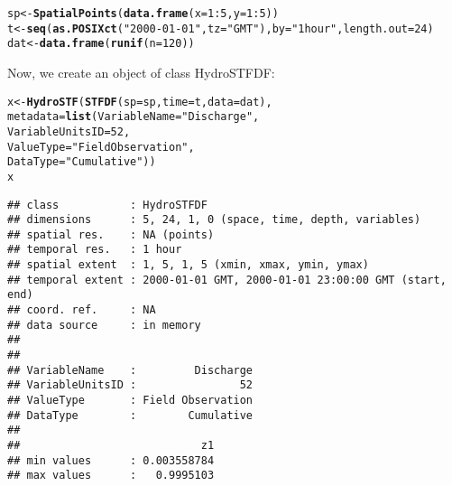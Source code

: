 \documentclass{icldt}\usepackage[]{graphicx}\usepackage[]{color}
\makeatletter
\newcommand{\hlnum}[1]{\textcolor[rgb]{0.686,0.059,0.569}{#1}}%
\newcommand{\hlstr}[1]{\textcolor[rgb]{0.192,0.494,0.8}{#1}}%
\newcommand{\hlopt}[1]{\textcolor[rgb]{0,0,0}{#1}}%
\newcommand{\hlstd}[1]{\textcolor[rgb]{0.345,0.345,0.345}{#1}}%
\newcommand{\hlkwb}[1]{\textcolor[rgb]{0.69,0.353,0.396}{#1}}%
\newcommand{\hlkwc}[1]{\textcolor[rgb]{0.333,0.667,0.333}{#1}}%
\newcommand{\hlkwd}[1]{\textcolor[rgb]{0.737,0.353,0.396}{\textbf{#1}}}%
\newenvironment{kframe}{%
 \def\at@end@of@kframe{}%
 \ifinner\ifhmode%
  \def\at@end@of@kframe{\end{minipage}}%
  \begin{minipage}{\columnwidth}%
 \fi\fi%
 \def\FrameCommand##1{\hskip\@totalleftmargin \hskip-\fboxsep
 \colorbox{shadecolor}{##1}\hskip-\fboxsep
     \hskip-\linewidth \hskip-\@totalleftmargin \hskip\columnwidth}%
 \MakeFramed {\advance\hsize-\width
   \@totalleftmargin\z@ \linewidth\hsize
   \@setminipage}}%
 {\par\unskip\endMakeFramed%
 \at@end@of@kframe}
\newenvironment{knitrout}{}{} %
\makeatother
\begin{document}
\begin{knitrout}
\color{fgcolor}\begin{kframe}
\begin{alltt}
\hlstd{sp} \hlkwb{<-} \hlkwd{SpatialPoints}\hlstd{(}\hlkwd{data.frame}\hlstd{(}\hlkwc{x}\hlstd{=}\hlnum{1}\hlopt{:}\hlnum{5}\hlstd{,} \hlkwc{y}\hlstd{=}\hlnum{1}\hlopt{:}\hlnum{5}\hlstd{))}
\hlstd{t} \hlkwb{<-} \hlkwd{seq}\hlstd{(}\hlkwd{as.POSIXct}\hlstd{(}\hlstr{"2000-01-01"}\hlstd{,} \hlkwc{tz}\hlstd{=}\hlstr{"GMT"}\hlstd{),} \hlkwc{by}\hlstd{=}\hlstr{"1 hour"}\hlstd{,} \hlkwc{length.out}\hlstd{=}\hlnum{24}\hlstd{)}
\hlstd{dat} \hlkwb{<-} \hlkwd{data.frame}\hlstd{(}\hlkwd{runif}\hlstd{(}\hlkwc{n}\hlstd{=}\hlnum{120}\hlstd{))}
\end{alltt}
\end{kframe}
\end{knitrout}

\noindent Now, we create an object of class HydroSTFDF:

\begin{knitrout}
\color{fgcolor}\begin{kframe}
\begin{alltt}
\hlstd{x} \hlkwb{<-} \hlkwd{HydroSTF}\hlstd{(}\hlkwd{STFDF}\hlstd{(}\hlkwc{sp}\hlstd{=sp,} \hlkwc{time}\hlstd{=t,} \hlkwc{data}\hlstd{=dat),}
              \hlkwc{metadata}\hlstd{=}\hlkwd{list}\hlstd{(}\hlkwc{VariableName}\hlstd{=}\hlstr{"Discharge"}\hlstd{,}
                            \hlkwc{VariableUnitsID}\hlstd{=}\hlnum{52}\hlstd{,}
                            \hlkwc{ValueType}\hlstd{=}\hlstr{"Field Observation"}\hlstd{,}
                            \hlkwc{DataType}\hlstd{=}\hlstr{"Cumulative"}\hlstd{))}
\hlstd{x}
\end{alltt}
\begin{verbatim}
## class           : HydroSTFDF
## dimensions      : 5, 24, 1, 0 (space, time, depth, variables)
## spatial res.    : NA (points)
## temporal res.   : 1 hour
## spatial extent  : 1, 5, 1, 5 (xmin, xmax, ymin, ymax)
## temporal extent : 2000-01-01 GMT, 2000-01-01 23:00:00 GMT (start, end)
## coord. ref.     : NA
## data source     : in memory
## 
## 
## VariableName    :         Discharge
## VariableUnitsID :                52
## ValueType       : Field Observation
## DataType        :        Cumulative
## 
##                            z1
## min values      : 0.003558784
## max values      :   0.9995103
\end{verbatim}
\end{kframe}
\end{knitrout}
\end{document}
